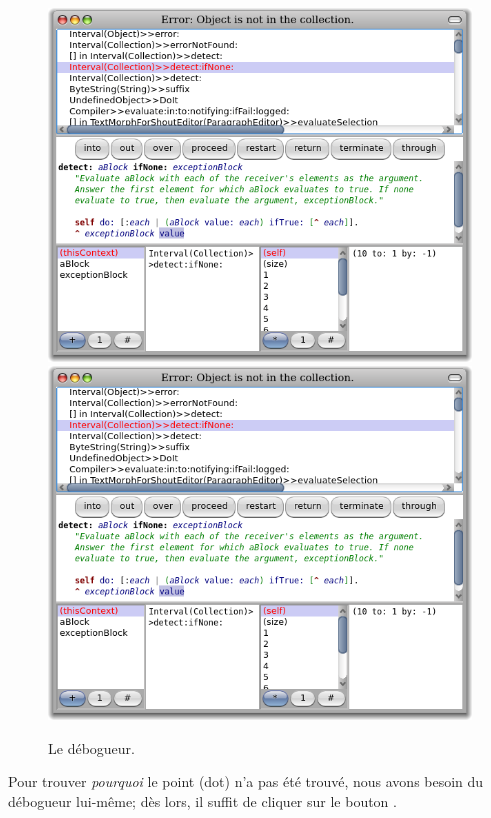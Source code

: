 \documentclass[a4paper,10pt,twoside]{book}
\begin{document}
\begin{figure}[btp]
	\begin{center}
	\ifluluelse
		{\includegraphics[width=\textwidth]{debuggerDetectIfNone}}
		{\includegraphics[scale=0.7]{debuggerDetectIfNone}}
	\end{center}
	\caption{Le d\'ebogueur.}
	\label{fig:debuggerDetectIfNone}
\end{figure}

Pour trouver \emph{pourquoi} le point (dot) n'a pas \'et\'e trouv\'e,
nous avons besoin du d\'ebogueur lui-m\^eme; d\`es lors, il suffit de
cliquer sur le bouton .
\end{document}
